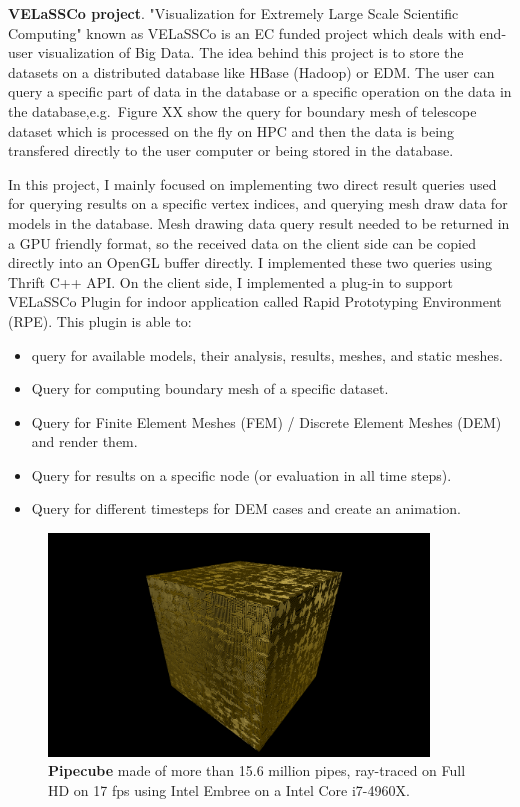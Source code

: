 \documentclass[]{report}
\begin{document}
\textbf{VELaSSCo project}. "Visualization for Extremely Large Scale Scientific Computing" known as VELaSSCo is an EC funded project which deals with end-user visualization of Big Data. The idea behind this project is to store the datasets on a distributed database like HBase (Hadoop) or EDM. The user can query a specific part of data in the database or a specific operation on the data in the database,e.g.~Figure XX show the query for boundary mesh of telescope dataset which is processed on the fly on HPC and then the data is being transfered directly to the user computer or being stored in the database.

In this project, I mainly focused on implementing two direct result queries used for querying results on a specific vertex indices, and querying mesh draw data for models in the database. Mesh drawing data query result needed to be returned in a GPU friendly format, so the received data on the client side can be copied directly into an OpenGL buffer directly. I implemented these two queries using Thrift C++ API. On the client side, I implemented a plug-in to support VELaSSCo Plugin for indoor application called Rapid Prototyping Environment (RPE). This plugin is able to:

\begin{itemize}
	\item query for available models, their analysis, results, meshes, and static meshes.
	\item Query for computing boundary mesh of a specific dataset.
	\item Query for Finite Element Meshes (FEM) / Discrete Element Meshes (DEM) and render them.
	\item Query for results on a specific node (or evaluation in all time steps).
	\item Query for different timesteps for DEM cases and create an animation.
\end{itemize}

\begin{figure}[!ht]
	\centering
	\includegraphics[width=0.90\textwidth]{./figs/pipecube.png}
	\caption[Pipecube]{\textbf{Pipecube} made of more than 15.6 million pipes, ray-traced on Full HD on 17 fps using Intel Embree on a Intel Core i7-4960X.}
	\label{fig:pipecube}
\end{figure}
\end{document}
